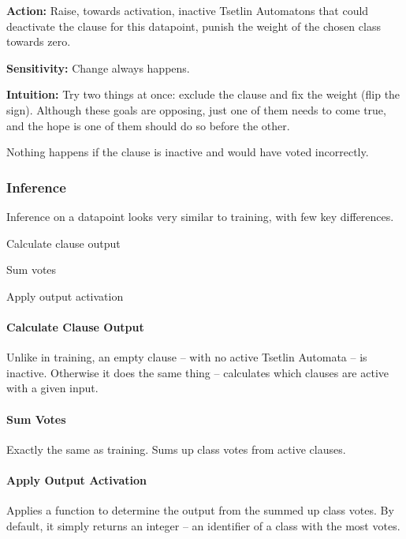 \begin{compactitem}
\begin{compactitem}
        \item \textbf{Action:} Raise, towards activation, inactive Tsetlin Automatons that could deactivate the clause for this datapoint, punish the weight of the chosen class towards zero.
        \item \textbf{Sensitivity:} Change always happens.
        \item \textbf{Intuition:} Try two things at once: exclude the clause and fix the weight (flip the sign). Although these goals are opposing, just one of them needs to come true, and the hope is one of them should do so before the other.
    \end{compactitem}
\item Nothing happens if the clause is inactive and would have voted incorrectly.
\end{compactitem}

\subsubsection{Inference}
Inference on a datapoint looks very similar to training, with few key differences.
\begin{compactenum}
    \item Calculate clause output
    \item Sum votes
    \item Apply output activation
\end{compactenum}

\paragraph{Calculate Clause Output}
Unlike in training, an empty clause -- with no active Tsetlin Automata -- is inactive. Otherwise it does the same thing -- calculates which clauses are active with a given input.

\paragraph{Sum Votes}
Exactly the same as training. Sums up class votes from active clauses.

\paragraph{Apply Output Activation}
Applies a function to determine the output from the summed up class votes. By default, it simply returns an integer -- an identifier of a class with the most votes.

